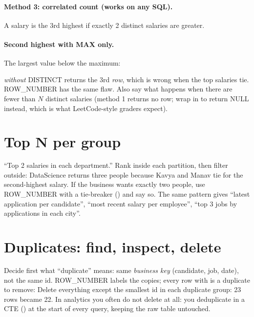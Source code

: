 \paragraph{Method 3: correlated count (works on any SQL).} A salary is the 3rd highest if exactly 2 distinct salaries are greater.
\paragraph{Second highest with MAX only.} The largest value below the maximum:
\begin{trap}
 \emph{without} DISTINCT returns the 3rd \emph{row}, which is wrong when the top salaries tie. ROW\_NUMBER has
the same flaw. Also say what happens when there are fewer than $N$ distinct salaries (method 1 returns no row; wrap in
 to return NULL instead, which is what LeetCode-style graders expect).
\end{trap}

\section{Top N per group}
``Top 2 salaries in each department.'' Rank inside each partition, then filter outside:
DataScience returns three people because Kavya and Manav tie for the second-highest salary. If the business wants exactly two people, use ROW\_NUMBER with
a tie-breaker () and say so. The same pattern gives ``latest application per candidate'', ``most recent salary
per employee'', ``top 3 jobs by applications in each city''.

\section{Duplicates: find, inspect, delete}
Decide first what ``duplicate'' means: same \emph{business key} (candidate, job, date), not the same id.
ROW\_NUMBER labels the copies; every row with  is a duplicate to remove:
Delete everything except the smallest id in each duplicate group:
23 rows became 22. In analytics you often do not delete at all: you deduplicate in a CTE () at the start of every query, keeping the
raw table untouched.

